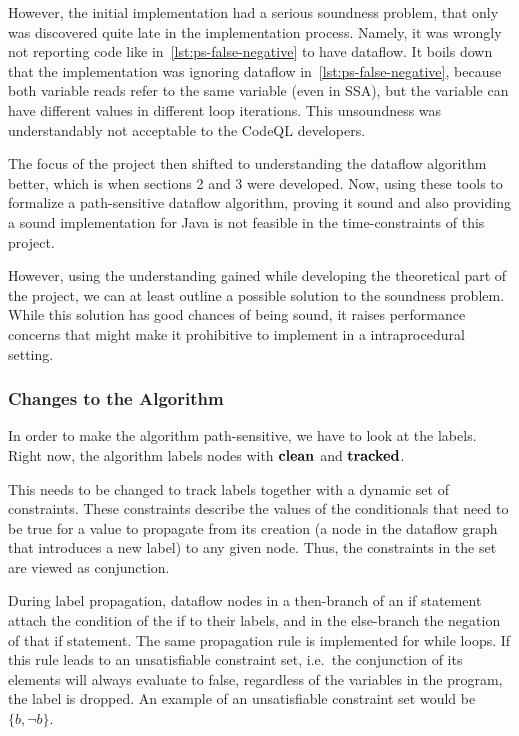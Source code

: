 However, the initial implementation had a serious soundness problem, that only was discovered
quite late in the implementation process.
Namely, it was wrongly not reporting code like in~\autoref{lst:ps-false-negative} to have dataflow.
It boils down that the implementation was ignoring dataflow in~\autoref{lst:ps-false-negative},
because both variable reads refer to the same variable (even in SSA), but the 
variable can have different values in different loop iterations.
This unsoundness was understandably not acceptable to the CodeQL developers.

The focus of the project then shifted to understanding the dataflow algorithm better,
which is when sections 2 and 3 were developed.
Now, using these tools to formalize a path-sensitive dataflow algorithm, proving it sound
and also providing a sound implementation for Java is not feasible in the time-constraints
of this project.

However, using the understanding gained while developing the theoretical part of the project,
we can at least outline a possible solution to the soundness problem.
While this solution has good chances of being sound, it raises performance concerns
that might make it prohibitive to implement in a intraprocedural setting.

\subsubsection*{Changes to the Algorithm} 
In order to make the algorithm path-sensitive, we have to look at the labels.
Right now, the algorithm labels nodes with $\textbf{clean}$ and $\textbf{tracked}$.

This needs to be changed to track labels together with a dynamic set of constraints.
These constraints describe the values of the conditionals that need to be true for a value
to propagate from its creation (a node in the dataflow graph that introduces a new label)
to any given node. Thus, the constraints in the set are viewed as conjunction.

During label propagation, dataflow nodes in a then-branch of an if statement attach the condition of the
if to their labels, and in the else-branch the negation of that if statement.
The same propagation rule is implemented for while loops.
If this rule leads to an unsatisfiable constraint set, i.e.\ the conjunction of its 
elements will always evaluate to false, regardless of the variables in the program,
the label is dropped.
An example of an unsatisfiable constraint set would be $\{b, \neg b\}$.


